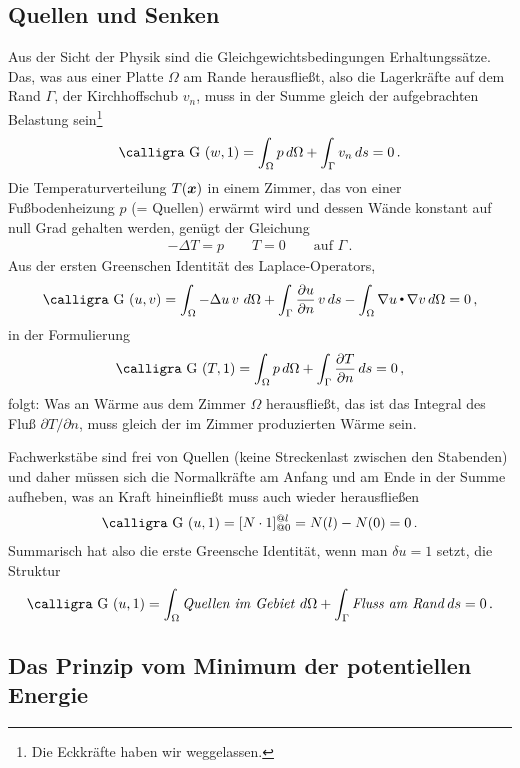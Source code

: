{{{{{%
{\textcolor{sectionTitleBlue}{\section{Quellen und Senken}}}
Aus der Sicht der Physik sind die Gleichgewichtsbedingungen Erhaltungss\"{a}tze. Das, was aus einer Platte $\Omega$ am Rande herausflie{\ss}t, also die Lagerkr\"{a}fte auf dem Rand $\Gamma$, der Kirchhoffschub $v_n$, muss in der Summe gleich der aufgebrachten Belastung sein\footnote{Die Eckkr\"{a}fte haben wir weggelassen.}
\begin{align}
\text{\normalfont\calligra G\,\,}(w,1) = \int_{\Omega} p \,d\Omega + \int_{\Gamma} v_n\,ds = 0\,.
\end{align}
Die Temperaturverteilung $T(\mbox{\boldmath $x$})$ in einem Zimmer, das von einer Fu{\ss}bodenheizung $p$ (= Quellen) erw\"{a}rmt wird und dessen W\"{a}nde konstant auf null Grad gehalten werden, gen\"{u}gt der Gleichung
\begin{align}
- \Delta T = p \qquad T = 0 \qquad \text{auf $\Gamma$}\,.
\end{align}
Aus der ersten Greenschen Identit\"{a}t des Laplace-Operators,
\begin{align}\label{Eq90}
\text{\normalfont\calligra G\,\,}(u, v) = \int_{\Omega} - \Delta u\,v\,\,d\Omega + \int_{\Gamma} \frac{\partial u}{\partial n}\,v\,ds - \int_{\Omega} \nabla u \dotprod \nabla v\,d\Omega = 0\,,
\end{align}
in der Formulierung
\begin{align}
\text{\normalfont\calligra G\,\,}(T,1) = \int_{\Omega} p \,d\Omega + \int_{\Gamma} \frac{\partial T}{\partial n}\,ds = 0\,,
\end{align}
folgt: Was an W\"{a}rme aus dem Zimmer $\Omega$ herausflie{\ss}t, das ist das Integral des Flu{\ss} $\partial T/\partial n$, muss gleich der im Zimmer produzierten W\"{a}rme sein.

Fachwerkst\"{a}be sind frei von Quellen (keine Streckenlast zwischen den Stabenden) und daher m\"{u}ssen sich die Normalkr\"{a}fte am Anfang und am Ende in der Summe aufheben, was an Kraft hineinflie{\ss}t muss auch wieder herausflie{\ss}en
\begin{align}
\text{\normalfont\calligra G\,\,}(u,1) = [N\cdot 1]_{@0}^{@l} = N(l) - N(0) = 0\,.
\end{align}
Summarisch hat also die erste Greensche Identit\"{a}t, wenn man $\delta u = 1$ setzt, die Struktur
\begin{align}
\text{\normalfont\calligra G\,\,}(u,1) = \int_{\Omega} \text{{\em Quellen im Gebiet\/}}\,\,d\Omega + \int_{\Gamma} \text{{\em Fluss am Rand\/}}\,ds = 0\,.
\end{align}
{\textcolor{sectionTitleBlue}{\section{Das Prinzip vom Minimum der potentiellen Energie}}}

}}}}}
